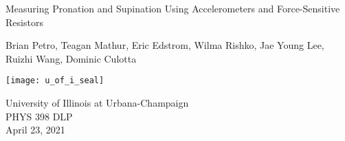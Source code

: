 \begin{titlepage}
  \begin{center}
    \vspace*{1cm}

    \Huge
    Measuring Pronation and Supination Using Accelerometers and Force-Sensitive Resistors

    \vspace{1.5cm}

    \large Brian Petro, Teagan Mathur, Eric Edstrom, Wilma Rishko,
    Jae Young Lee, Ruizhi Wang, Dominic Culotta

    \vspace{0.8cm}

    \texttt{[image: u\_of\_i\_seal]}

    \vfill

    \Large
    University of Illinois at Urbana-Champaign\\
    PHYS 398 DLP\\
    April 23, 2021

    \end{center}
  \end{titlepage}
